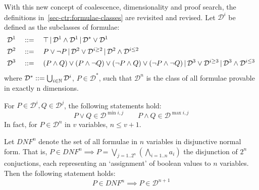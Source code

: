     \begin{definition*}
        With this new concept of coalescence, dimensionality and proof search, the definitions in~\ref{sec-ctr:formulae-classes} are revisited and revised.
        Let $\mathcal{D}^i$ be defined as the subclasses of formulae:
        \begin{align*}
            \mathcal{D}^1 \quad &::= \quad \top \,|\, \mathcal{D}^1 \wedge \mathcal{D}^1 \,|\, \mathcal{D}^* \vee \mathcal{D}^1 \\
            \mathcal{D}^2 \quad &::= \quad P \vee \neg P \,|\, \mathcal{D}^2 \vee \mathcal{D}^{i \geq 2} \,|\, \mathcal{D}^2 \wedge \mathcal{D}^{i \leq 2} \\
            \mathcal{D}^3 \quad &::= \quad (P \wedge Q) \vee (P \wedge \neg Q) \vee (\neg P \wedge Q) \vee (\neg P \wedge \neg Q) \,|\, \mathcal{D}^3 \vee \mathcal{D}^{i \geq 3} \,|\, \mathcal{D}^3 \wedge \mathcal{D}^{i \leq 3}
        \end{align*}
        where $\mathcal{D}^* ::= \bigcup_{i \in \mathbb{N}} \mathcal{D}^i$, $P \in \mathcal{D}^*$, such that $\mathcal{D}^n$ is the class of all formulae provable in exactly n dimensions.
    \end{definition*}
    
    \begin{corollary*}
        For $P \in \mathcal{D}^i, Q \in \mathcal{D}^j$, the following statements hold:
        \begin{equation*}
            P \vee Q \in \mathcal{D}^{\min{i, j}}
            \qquad
            P \wedge Q \in \mathcal{D}^{\max{i, j}}
        \end{equation*}
        In fact, for $P \in \mathcal{D}^n$ in $v$ variables, $n \leq v + 1$.
    \end{corollary*}


    \begin{proposition}
        Let $\textit{DNF}^n$ denote the set of all formulae in $n$ variables in disjunctive normal form.
        That is, $P \in \textit{DNF}^n \implies P = \bigvee_{j = 1 .. 2^n} (\bigwedge_{i = 1 .. n} a_i)$ the disjunction of $2^n$ conjuctions, each representing an `assignment' of boolean values to $n$ variables.
        Then the following statement holds:
        \begin{equation*}
            P \in \textit{DNF}^n \implies P \in \mathcal{D}^{n+1}
        \end{equation*}
    \end{proposition}

